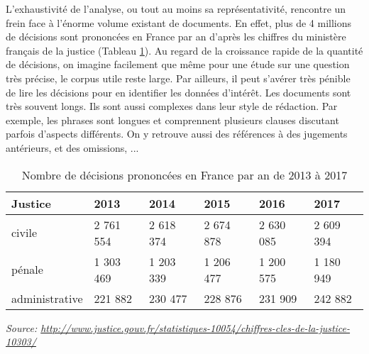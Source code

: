 L'exhaustivité de l'analyse, ou tout au moins sa représentativité, rencontre un frein face à l'énorme volume existant de documents. En effet, plus de 4 millions de décisions sont prononcées en France par an d'après les chiffres du ministère français de la justice (Tableau \ref{tab:intro:nbdecisionstats}). Au regard de la croissance rapide de la quantité de décisions, on imagine facilement que même pour une étude sur une question très précise, le corpus utile reste large. Par ailleurs, il peut s'avérer très pénible de lire les décisions pour en identifier les données d'intérêt. Les documents sont très souvent longs. Ils sont aussi complexes dans leur style de rédaction. Par exemple, les phrases sont longues et comprennent plusieurs clauses discutant parfois d'aspects différents. On y retrouve aussi des références à des jugements antérieurs, et des omissions, ...
\begin{table}
\small
\begin{center}
\begin{tabular}{|l|l|l|l|l|l|}
	\hline
\textbf{Justice}	& \textbf{2013}      & \textbf{2014}      & \textbf{2015}      & \textbf{2016}      & \textbf{2017}      \\ \hline
	civile         & 2 761 554 & 2 618 374 & 2 674 878 & 2 630 085 & 2 609 394 \\ \hline
	pénale         & 1 303 469 & 1 203 339 & 1 206 477 & 1 200 575 & 1 180 949 \\ \hline
	administrative & 221 882   & 230 477   & 228 876   & 231 909   & 242 882   \\ \hline
\end{tabular}

\textit{\scriptsize{Source: \url{http://www.justice.gouv.fr/statistiques-10054/chiffres-cles-de-la-justice-10303/}}}  
\end{center}
\caption{Nombre de décisions prononcées en France par an de 2013 à 2017}\label{tab:intro:nbdecisionstats}
\end{table}


